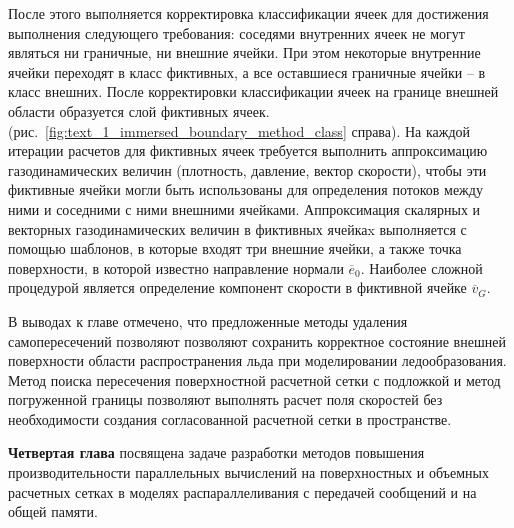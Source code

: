 \documentclass[a4paper,14pt]{extarticle}                     %
\theoremstyle{plain}                                         %
\begin{document}
После этого выполняется корректировка классификации ячеек для достижения выполнения следующего требования: соседями внутренних ячеек не могут являться ни граничные, ни внешние ячейки.
При этом некоторые внутренние ячейки переходят в класс фиктивных, а все оставшиеся граничные ячейки -- в класс внешних.
После корректировки классификации ячеек на границе внешней области образуется слой фиктивных ячеек. (рис.~\ref{fig:text_1_immersed_boundary_method_class} справа).
На каждой итерации расчетов для фиктивных ячеек требуется выполнить аппроксимацию газодинамических величин (плотность, давление, вектор скорости), чтобы эти фиктивные ячейки могли быть использованы для определения потоков между ними и соседними с ними внешними ячейками.
Аппроксимация скалярных и векторных газодинамических величин в фиктивных ячейкаx выполняется с помощью шаблонов, в которые входят три внешние ячейки, а также точка поверхности, в которой известно направление нормали $\overline{e}_0$.
Наиболее сложной процедурой является определение компонент скорости в фиктивной ячейке $\overline{v}_G$.

В выводах к главе отмечено, что предложенные методы удаления самопересечений позволяют позволяют сохранить корректное состояние внешней поверхности области распространения льда при моделировании ледообразования.
Метод поиска пересечения поверхностной расчетной сетки с подложкой и метод погруженной границы позволяют выполнять расчет поля скоростей без необходимости создания согласованной расчетной сетки в пространстве.


\newpage
\textbf{Четвертая глава} посвящена задаче разработки методов повышения производительности параллельных вычислений на поверхностных и объемных расчетных сетках в моделях распараллеливания с передачей сообщений и на общей памяти.

\end{document}
